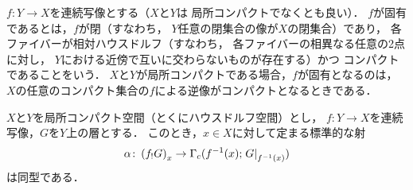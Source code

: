 \(f\colon Y\to X\)を連続写像とする（\(X\)と\(Y\)は
局所コンパクトでなくとも良い）．
\(f\)が固有であるとは，\(f\)が閉（すなわち，
\(Y\)任意の閉集合の像が\(X\)の閉集合）であり，
各ファイバーが相対ハウスドルフ（すなわち，
各ファイバーの相異なる任意の2点に対し，
\(Y\)における近傍で互いに交わらないものが存在する）かつ
コンパクトであることをいう．
\(X\)と\(Y\)が局所コンパクトである場合，\(f\)が固有となるのは，
\(X\)の任意のコンパクト集合の\(f\)による逆像がコンパクトとなるときである．

\begin{PRP}\label{prp252}
    \(X\)と\(Y\)を局所コンパクト空間（とくにハウスドルフ空間）とし，
    \(f\colon Y\to X\)を連続写像，\(G\)を\(Y\)上の層とする．
    このとき，\(x\in X\)に対して定まる標準的な射
    \[
        \alpha\colon \left(f_{!}G\right)_x
        \to
        \Gamma_{c}(f^{-1}(x);\mres[G]{f^{-1}(x)})
    \]
    は同型である．
\end{PRP}


